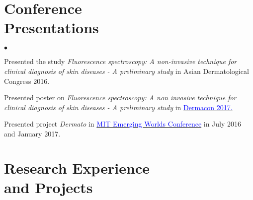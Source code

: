 \documentclass[margin,line]{res}
\newenvironment{list2}{
  \begin{list}{$\bullet$}{%
      \setlength{\itemsep}{0in}
      \setlength{\parsep}{0in} \setlength{\parskip}{0in}
      \setlength{\topsep}{0in} \setlength{\partopsep}{0in}
      \setlength{\leftmargin}{0.2in}}}{\end{list}}
\begin{document}
\begin{resume}
\section{\sc Conference \\ Presentations}
\begin{list2}
\item Presented the study {\em Fluorescence spectroscopy: A non-invasive technique for clinical diagnosis of skin diseases - A preliminary study } in Asian Dermatological Congress 2016.  %
\item Presented poster on  {\em Fluorescence spectroscopy: A non invasive technique for clinical diagnosis of skin diseases - A preliminary study } in \href{http://www.dermacon2017kolkata.com/}{\textcolor{blue}{Dermacon 2017.}}
\item Presented project {\em Dermato } in \href{http://mitemergingworlds.com/}{\textcolor{blue}{MIT Emerging Worlds Conference}} in  July 2016 and January 2017.
\end{list2}

\vspace*{-0.1in}

\section{\sc Research Experience \\ and Projects}


\end{resume}
\end{document}
